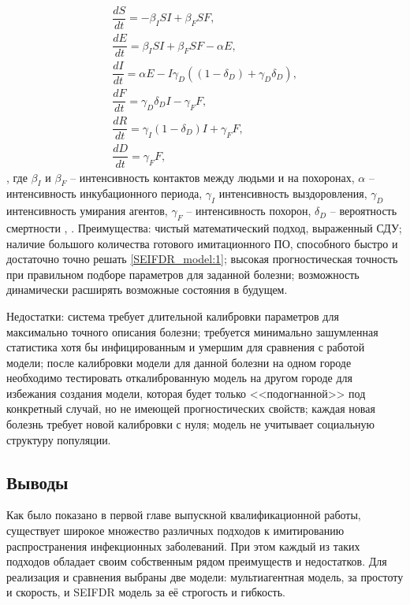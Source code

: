 \begin{gather} 
\nonumber	\dfrac{dS}{dt} = -\beta_I S I + \beta_F S F, \\
\nonumber	\dfrac{dE}{dt} = \beta_I S I + \beta_F S F - \alpha E, \\
	\dfrac{dI}{dt} = \alpha E - I \gamma_D ( (1 - \delta_D) + \gamma_D \delta_D), \label{SEIFDR_model:1} \\
\nonumber	\dfrac{dF}{dt} = \gamma_D \delta_D I - \gamma_F F, \\
\nonumber	\dfrac{dR}{dt} = \gamma_I(1-\delta_D) I + \gamma_F F, \\
\nonumber 	\dfrac{dD}{dt} = \gamma_F F,
\end{gather}
,  где $\beta_I$ и $\beta_F$ -- интенсивность контактов между людьми и на похоронах, $\alpha$ --  интенсивность инкубационного периода, $\gamma_I$ интенсивность выздоровления, $\gamma_D$  интенсивность умирания агентов, $\gamma_F$ --   интенсивность похорон, $\delta_D$ -- вероятность смертности 
\cite{Plos_Outbreak:1}, \cite{Plos_Outbreak:2}. 
Преимущества: чистый математический подход, выраженный СДУ; наличие большого количества готового имитационного ПО, способного быстро и достаточно точно решать \eqref{SEIFDR_model:1}; высокая прогностическая точность при правильном подборе параметров для заданной болезни; возможность динамически расширять возможные состояния в будущем.

Недостатки: система требует длительной калибровки параметров для максимально точного описания болезни; требуется минимально зашумленная статистика хотя бы инфицированным и умершим для сравнения с работой модели; после калибровки модели для данной болезни на одном городе необходимо тестировать откалиброванную модель на другом городе для избежания создания модели, которая будет только <<подогнанной>> под конкретный случай, но не имеющей прогностических свойств; каждая новая болезнь требует новой калибровки с нуля; модель не учитывает социальную структуру популяции.

\subsection{Выводы}
Как было показано в первой главе выпускной квалификационной работы, существует широкое множество различных подходов к имитированию распространения инфекционных заболеваний. При этом каждый из таких подходов обладает своим собственным рядом преимуществ и недостатков. Для реализация и сравнения выбраны две модели: мультиагентная модель, за простоту и скорость, и SEIFDR модель за её строгость и гибкость.